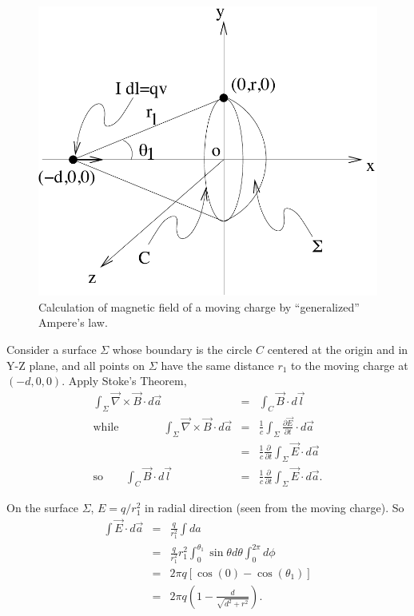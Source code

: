 \documentclass[solutions]{esg8022pset}
\begin{document}
 \begin{figure}[H]
    \centering
    \includegraphics[width = 15cm]{m6}
    \caption{Calculation of magnetic field of a moving charge by
``generalized'' Ampere's law.}
  \end{figure}

Consider a surface $\Sigma$ whose boundary is the circle $C$ centered
at the origin and in Y-Z plane, and all points on $\Sigma$ have the
same distance $r_1$ to the moving charge at $(-d,0,0)$.  Apply Stoke's
Theorem,
\begin{eqnarray}
\int_{\Sigma} \vec{\nabla}\times\vec{B}\cdot d\vec{a} &=& \int_C
\vec{B}\cdot d\vec{l}\\
\textrm{while} \qquad\qquad \int_{\Sigma} \vec{\nabla}\times\vec{B}\cdot
d\vec{a} &=& \frac{1}{c}\int_{\Sigma} \frac{\partial \vec{E}}{\partial
t}\cdot d\vec{a}\nonumber\\
&=& \frac{1}{c}\frac{\partial}{\partial t}\int_{\Sigma} \vec{E}\cdot
d\vec{a}\\
\textrm{so}\qquad \int_C \vec{B}\cdot d\vec{l} &=&
\frac{1}{c}\frac{\partial}{\partial t}\int_{\Sigma} \vec{E}\cdot
d\vec{a}.
\end{eqnarray}

On the surface $\Sigma$, $E=q/r_1^2$ in radial direction (seen from
the moving charge).  So
\begin{eqnarray}
\int \vec{E}\cdot d\vec{a} &=& \frac{q}{r_1^2}\int da\nonumber\\
&=& \frac{q}{r_1^2}r_1^2\int_{0}^{\theta_1}\sin\theta d\theta
\int_0^{2\pi}d\phi\nonumber\\
&=& 2\pi q\left[\cos(0) - \cos(\theta_1)\right]\nonumber\\
&=& 2\pi q(1-\frac{d}{\sqrt{d^2+r^2}}).
\end{eqnarray}
\end{document}
